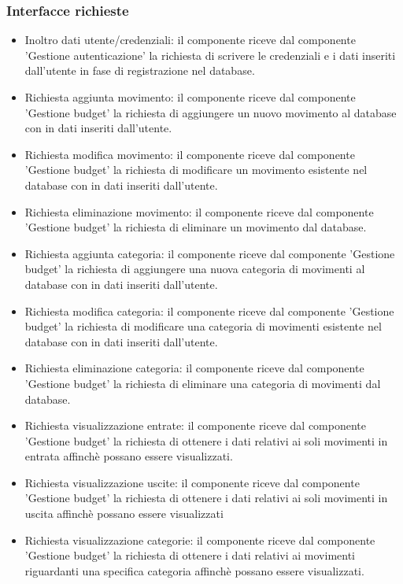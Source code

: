 \documentclass[a4paper,12pt]{article}
\begin{document}
\subsubsection*{Interfacce richieste}
\begin{itemize} \setlength\itemsep{0.01em}
\item {\sffamily Inoltro dati utente/credenziali}: il componente riceve dal componente 'Gestione autenticazione' la richiesta di scrivere le credenziali e i dati inseriti dall'utente in fase di registrazione nel database.
\item {\sffamily Richiesta aggiunta movimento}: il componente riceve dal componente 'Gestione budget' la richiesta di aggiungere un nuovo movimento al database con in dati inseriti dall'utente. 
\item {\sffamily Richiesta modifica movimento}: il componente riceve dal componente 'Gestione budget' la richiesta di modificare un movimento esistente nel database con in dati inseriti dall'utente. 
\item {\sffamily Richiesta eliminazione movimento}:  il componente riceve dal componente 'Gestione budget' la richiesta di eliminare un movimento dal database.
\item {\sffamily Richiesta aggiunta categoria}:  il componente riceve dal componente 'Gestione budget' la richiesta di aggiungere una nuova categoria di movimenti al database con in dati inseriti dall'utente. 
\item {\sffamily Richiesta modifica categoria}: il componente riceve dal componente 'Gestione budget' la richiesta di modificare una categoria di movimenti esistente nel database con in dati inseriti dall'utente.
\item {\sffamily Richiesta eliminazione categoria}: il componente riceve dal componente 'Gestione budget' la richiesta di eliminare una categoria di movimenti dal database.
\item {\sffamily Richiesta visualizzazione entrate}: il componente riceve dal componente 'Gestione budget' la richiesta di ottenere i dati relativi ai soli movimenti in entrata affinchè possano essere visualizzati.  
\item {\sffamily Richiesta visualizzazione uscite}: il componente riceve dal componente 'Gestione budget' la richiesta di ottenere i dati relativi ai soli movimenti in uscita affinchè possano essere visualizzati
\item {\sffamily Richiesta visualizzazione categorie}: il componente riceve dal componente 'Gestione budget' la richiesta di ottenere i dati relativi ai movimenti riguardanti una specifica categoria affinchè possano essere visualizzati.

\end{itemize}
\end{document}
